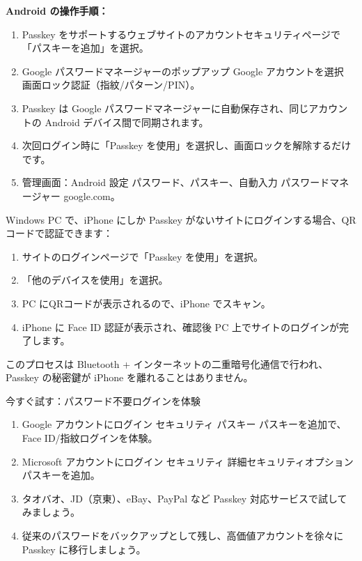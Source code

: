 \textbf{Android の操作手順：}

\begin{enumerate}
  \item Passkey をサポートするウェブサイトのアカウントセキュリティページで「パスキーを追加」を選択。
  \item Google パスワードマネージャーのポップアップ Google アカウントを選択 画面ロック認証（指紋/パターン/PIN）。
  \item Passkey は Google パスワードマネージャーに自動保存され、同じアカウントの Android デバイス間で同期されます。
  \item 次回ログイン時に「Passkey を使用」を選択し、画面ロックを解除するだけです。
  \item 管理画面：Android 設定 パスワード、パスキー、自動入力 パスワードマネージャー google.com。
\end{enumerate}


Windows PC で、iPhone にしか Passkey がないサイトにログインする場合、QRコードで認証できます：

\begin{enumerate}
  \item サイトのログインページで「Passkey を使用」を選択。
  \item 「他のデバイスを使用」を選択。
  \item PC にQRコードが表示されるので、iPhone でスキャン。
  \item iPhone に Face ID 認証が表示され、確認後 PC 上でサイトのログインが完了します。
\end{enumerate}

このプロセスは Bluetooth + インターネットの二重暗号化通信で行われ、Passkey の秘密鍵が iPhone を離れることはありません。

\begin{tcbpractice}{今すぐ試す：パスワード不要ログインを体験}
\begin{enumerate}
  \item Google アカウントにログイン セキュリティ パスキー パスキーを追加で、Face ID/指紋ログインを体験。
  \item Microsoft アカウントにログイン セキュリティ 詳細セキュリティオプション パスキーを追加。
  \item タオバオ、JD（京東）、eBay、PayPal など Passkey 対応サービスで試してみましょう。
  \item 従来のパスワードをバックアップとして残し、高価値アカウントを徐々に Passkey に移行しましょう。
\end{enumerate}

\end{tcbpractice}


